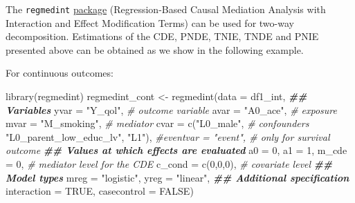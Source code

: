 \documentclass[
]{book}
\newenvironment{Shaded}{\begin{snugshade}}{\end{snugshade}}
\newcommand{\AttributeTok}[1]{\textcolor[rgb]{0.77,0.63,0.00}{#1}}
\newcommand{\CommentTok}[1]{\textcolor[rgb]{0.56,0.35,0.01}{\textit{#1}}}
\newcommand{\ConstantTok}[1]{\textcolor[rgb]{0.00,0.00,0.00}{#1}}
\newcommand{\DecValTok}[1]{\textcolor[rgb]{0.00,0.00,0.81}{#1}}
\newcommand{\DocumentationTok}[1]{\textcolor[rgb]{0.56,0.35,0.01}{\textbf{\textit{#1}}}}
\newcommand{\FunctionTok}[1]{\textcolor[rgb]{0.00,0.00,0.00}{#1}}
\newcommand{\NormalTok}[1]{#1}
\newcommand{\OtherTok}[1]{\textcolor[rgb]{0.56,0.35,0.01}{#1}}
\newcommand{\StringTok}[1]{\textcolor[rgb]{0.31,0.60,0.02}{#1}}
\begin{document}
The \texttt{regmedint} \href{https://cran.r-project.org/web/packages/regmedint/index.html}{package} (Regression-Based Causal Mediation Analysis with Interaction and Effect Modification Terms) can be used for two-way decomposition. Estimations of the CDE, PNDE, TNIE, TNDE and PNIE presented above can be obtained as we show in the following example.

For continuous outcomes:

\begin{Shaded}
\begin{Highlighting}[]
\FunctionTok{library}\NormalTok{(regmedint)}
\NormalTok{regmedint\_cont }\OtherTok{\textless{}{-}} \FunctionTok{regmedint}\NormalTok{(}\AttributeTok{data =}\NormalTok{ df1\_int,}
                            \DocumentationTok{\#\# Variables}
                            \AttributeTok{yvar =} \StringTok{"Y\_qol"}\NormalTok{,                   }\CommentTok{\# outcome variable}
                            \AttributeTok{avar =} \StringTok{"A0\_ace"}\NormalTok{,                  }\CommentTok{\# exposure}
                            \AttributeTok{mvar =} \StringTok{"M\_smoking"}\NormalTok{,               }\CommentTok{\# mediator}
                            \AttributeTok{cvar =} \FunctionTok{c}\NormalTok{(}\StringTok{"L0\_male"}\NormalTok{,               }\CommentTok{\# confounders}
                                     \StringTok{"L0\_parent\_low\_educ\_lv"}\NormalTok{,}
                                     \StringTok{"L1"}\NormalTok{),}
                            \CommentTok{\#eventvar = "event",     \# only for survival outcome}
                            \DocumentationTok{\#\# Values at which effects are evaluated}
                            \AttributeTok{a0 =} \DecValTok{0}\NormalTok{,}
                            \AttributeTok{a1 =} \DecValTok{1}\NormalTok{,}
                            \AttributeTok{m\_cde =} \DecValTok{0}\NormalTok{,              }\CommentTok{\# mediator level for the CDE}
                            \AttributeTok{c\_cond =} \FunctionTok{c}\NormalTok{(}\DecValTok{0}\NormalTok{,}\DecValTok{0}\NormalTok{,}\DecValTok{0}\NormalTok{),                 }\CommentTok{\# covariate level}
                            \DocumentationTok{\#\# Model types}
                            \AttributeTok{mreg =} \StringTok{"logistic"}\NormalTok{,}
                            \AttributeTok{yreg =} \StringTok{"linear"}\NormalTok{,}
                            \DocumentationTok{\#\# Additional specification}
                            \AttributeTok{interaction =} \ConstantTok{TRUE}\NormalTok{,}
                            \AttributeTok{casecontrol =} \ConstantTok{FALSE}\NormalTok{)}

\end{Highlighting}
\end{Shaded}
\end{document}
